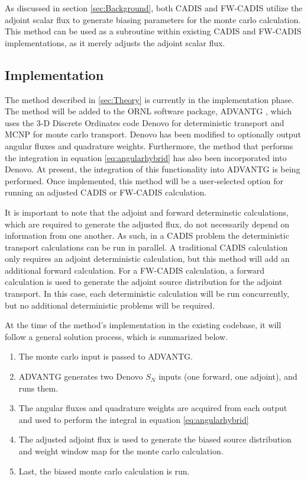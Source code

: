 \documentclass{mc2015}
\begin{document}
As discussed in section \ref{sec:Background}, both CADIS and FW-CADIS utilize the adjoint scalar flux to generate biasing parameters for the monte carlo calculation. 
This method can be used as a subroutine within existing CADIS and FW-CADIS implementations, as it merely adjusts the adjoint scalar flux.  

\subsection{Implementation}
\label{sec:Implement}

The method described in \ref{sec:Theory} is currently in the implementation phase. The method will be added to the ORNL software package, ADVANTG \cite{mosher_new_2010}, which uses the 3-D Discrete Ordinates code Denovo \cite{evans_denovo:_2010} for deterministic transport and MCNP \cite{brown_mcnp_2002} for monte carlo transport. Denovo has been modified to optionally output angular fluxes and quadrature weights. Furthermore, the method that performs the integration in equation \ref{eq:angularhybrid} has also been incorporated into Denovo. At present, the integration of this functionality into ADVANTG is being performed. Once implemented, this method will be a user-selected option for running an adjusted CADIS or FW-CADIS calculation. 

It is important to note that the adjoint and forward determinstic calculations, which are required to generate the adjusted flux, do not necessarily depend on information from one another. As such, in a CADIS problem the deterministic transport calculations can be run in parallel. A traditional CADIS calculation only requires an adjoint deterministic calculation, but this method will add an additional forward calculation. For a FW-CADIS calculation, a forward calculation is used to generate the adjoint source distribution for the adjoint transport. In this case, each deterministic calculation will be run concurrently, but no additional deterministic problems will be required. 

At the time of the method's implementation in the existing codebase, it will follow a general solution process, which is summarized below. 
\begin{enumerate}
\item The monte carlo input is passed to ADVANTG. 
\item ADVANTG generates two Denovo $S_N$ inputs (one forward, one adjoint), and runs them.
\item The angular fluxes and quadrature weights are acquired from each output and used to perform the integral in equation \ref{eq:angularhybrid}
\item The adjusted adjoint flux is used to generate the biased source distribution and weight window map for the monte carlo calculation.
\item Last, the biased monte carlo calculation is run. 
\end{enumerate}
\end{document}
